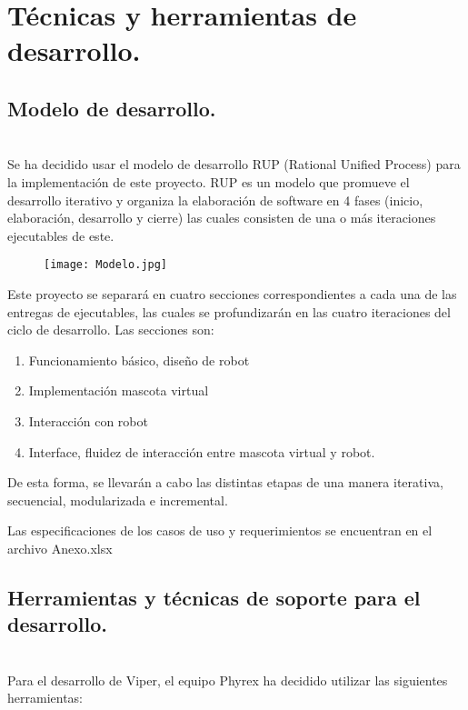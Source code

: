 \chapter{T\'ecnicas y herramientas de desarrollo.}
\newpage

\section{Modelo de desarrollo.}
~\\
Se ha decidido usar el modelo de desarrollo RUP (Rational Unified Process) para la implementaci\'on de este proyecto. RUP es un modelo que promueve el desarrollo iterativo y organiza la elaboraci\'on de software en 4 fases (inicio, elaboraci\'on, desarrollo y cierre) las cuales consisten de una o m\'as iteraciones ejecutables de este. 

\begin{figure}[H]
  \centering
  \texttt{[image: Modelo.jpg]}
  \label{fig:RUP}
\end{figure}

Este proyecto se separar\'a en cuatro secciones correspondientes a cada una de las entregas de ejecutables, las cuales se profundizar\'an en las cuatro iteraciones del ciclo de desarrollo. Las secciones son:

\begin{enumerate}
\item Funcionamiento b\'asico, dise\~no de robot
\item Implementaci\'on mascota virtual
\item Interacci\'on con robot
\item Interface, fluidez de interacci\'on entre mascota virtual y robot.
\end{enumerate}

De esta forma, se llevar\'an a cabo las distintas etapas de una manera iterativa, secuencial, modularizada e incremental.

Las especificaciones de los casos de uso y requerimientos se encuentran en el archivo Anexo.xlsx

\newpage
\section{Herramientas y t\'ecnicas de soporte para el desarrollo.}
~\\
Para el desarrollo de Viper, el equipo Phyrex ha decidido utilizar las siguientes herramientas:

